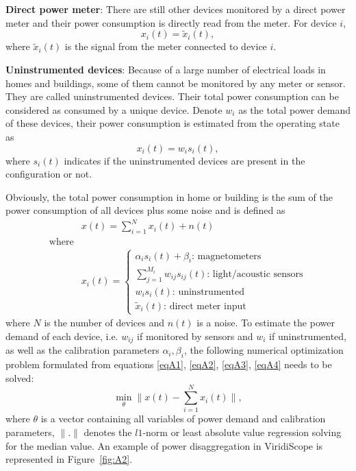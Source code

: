 \textbf{Direct power meter}: There are still other devices monitored by a direct power meter and their power consumption is directly read from the meter. For device $i$,
\begin{equation}\label{eqA3}
x_i(t)=\tilde{x}_i(t),
\end{equation}
where $\tilde{x}_i(t)$ is the signal from the meter connected to device $i$.

\textbf{Uninstrumented devices}: Because of a large number of electrical loads in homes and buildings, some of them cannot be monitored by any meter or sensor. They are called uninstrumented devices. Their total power consumption can be considered as consumed by a unique device. Denote $w_i$ as the total power demand of these devices, their power consumption is estimated from the operating state as
\begin{equation}\label{eqA4}
x_i(t)=w_i s_i(t),
\end{equation}
where $s_i(t)$ indicates if the uninstrumented devices are present in the configuration or not.

Obviously, the total power consumption in home or building is the sum of the power consumption of all devices plus some noise and is defined as
\begin{equation}\label{eqAA5}
\begin{split}
 &x(t)=\sum_{i=1}^{N}{x_i(t)}+n(t)\\
\mbox{where}& \\
 &x_i(t)=\begin{cases}
\alpha_is_i(t)+\beta_i \mbox{: magnetometers}\\
\sum_{j=1}^{M_i}{w_{ij}s_{ij}(t)} \mbox{: light/acoustic sensors}\\
w_is_i(t) \mbox{: uninstrumented}\\
\tilde{x}_i(t) \mbox{: direct meter input}
\end{cases}
\end{split}
\end{equation}
where $N$ is the number of devices and $n(t)$ is a noise. To estimate the power demand of each device, i.e. $w_{ij}$ if monitored by sensors and $w_i$ if uninstrumented, as well as the calibration parameters $\alpha_i,\beta_i$, the following numerical optimization problem formulated from equations \eqref{eqA1}, \eqref{eqA2}, \eqref{eqA3}, \eqref{eqA4} needs to be solved:
\begin{equation}\label{eqA5}
 \min_\theta{\parallel x(t)-\sum_{i=1}^{N}{x_i(t)}\parallel},
\end{equation}
where $\theta$ is a vector containing all variables of power demand and calibration parameters, $\parallel . \parallel$ denotes the $l1$-norm or least absolute value regression solving for the median value. An example of power disaggregation in ViridiScope is represented in Figure~\ref{fig:A2}.


